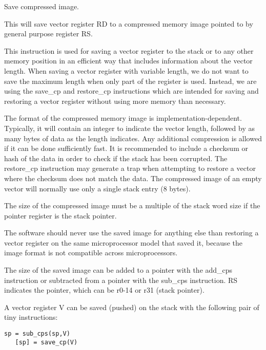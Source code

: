 \documentclass[forwardcom.tex]{subfiles}
\begin{document}
Save compressed image.
\vspace{2mm}

This will save vector register RD to a compressed memory image pointed to by general purpose register RS.
\vspace{2mm}

This instruction is used for saving a vector register to the stack or to any other memory position in an efficient way that includes information about the vector length. When saving a vector register with variable length, we do not want to save the maximum length when only part of the register is used. Instead, we are using the save\_cp and restore\_cp instructions which are intended for saving and restoring a vector register without using more memory than necessary.

\vspace{2mm}

The format of the compressed memory image is implementation-dependent. Typically, it will contain an integer to indicate the vector length, followed by as many bytes of data as the length indicates. Any additional compression is allowed if it can be done sufficiently fast. It is recommended to include a 
checksum or hash of the data in order to check if the stack has been corrupted. The restore\_cp instruction may generate a trap when attempting to restore a vector where the checksum does not match the data. The compressed image of an empty vector will normally use only a single stack entry (8 bytes).
\vspace{2mm}

The size of the compressed image must be a multiple of the stack word size if the pointer register is the stack pointer.
\vspace{2mm}

The software should never use the saved image for anything else than restoring a vector register on the same microprocessor model that saved it, because the image format is not compatible across microprocessors.
\vspace{2mm}

The size of the saved image can be added to a pointer with the add\_cps instruction or subtracted from a pointer with the sub\_cps instruction. RS indicates the pointer, which can be r0-14 or r31 (stack pointer).
\vspace{2mm}

A vector register V can be saved (pushed) on the stack with the following pair of tiny instructions:

\begin{lstlisting}[frame=none]
   sp = sub_cps(sp,V)
   [sp] = save_cp(V)
\end{lstlisting}
\end{document}
